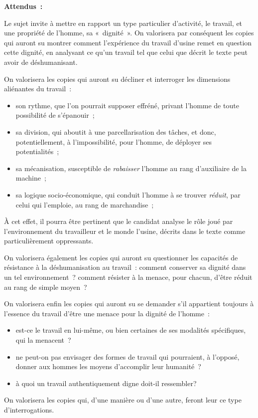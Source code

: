 {\textbf{Attendus~:}

Le sujet invite à mettre en rapport un type particulier d'activité, le travail, et une
propriété de l'homme, sa «~dignité~». On valorisera par conséquent les copies qui
auront su montrer comment l'expérience du travail d'usine remet en question cette
dignité, en analysant ce qu'un travail tel que celui que décrit le texte peut avoir de
déshumanisant.

On valorisera les copies qui auront su décliner et interroger les dimensions
aliénantes du travail~:

\begin{itemize}
\item son rythme, que l'on pourrait supposer effréné, privant l'homme de toute
possibilité de s'épanouir~;
\item sa division, qui aboutit à une parcellarisation des tâches, et donc,
potentiellement, à l'impossibilité, pour l'homme, de déployer ses potentialités~;
\item sa mécanisation, susceptible de \textit{rabaisser} l'homme au rang d'auxiliaire de la
machine~;
\item sa logique socio-économique, qui conduit l'homme à se trouver \textit{réduit}, par celui
qui l'emploie, au rang de marchandise~;
\end{itemize}

À cet effet, il pourra être pertinent que le candidat analyse le rôle joué par
l'environnement du travailleur et le monde l'usine, décrits dans le texte comme
particulièrement oppressants.

On valorisera également les copies qui auront su questionner les capacités de
résistance à la déshumanisation au travail~: comment conserver sa dignité dans un tel
environnement~? comment résister à la menace, pour chacun, d'être réduit au rang de
simple moyen~?

On valorisera enfin les copies qui auront su se demander s'il appartient toujours
à l'essence du travail d'être une menace pour la dignité de l'homme~:

\begin{itemize}
\item est-ce le travail en lui-même, ou bien certaines de ses modalités spécifiques,
qui la menacent~?
\item ne peut-on pas envisager des formes de travail qui pourraient, à l'opposé,
donner aux hommes les moyens d'accomplir leur humanité~?
\item à quoi un travail authentiquement digne doit-il ressembler?
\end{itemize}

On valorisera les copies qui, d'une manière ou d'une autre, feront leur ce type
d'interrogations.}

